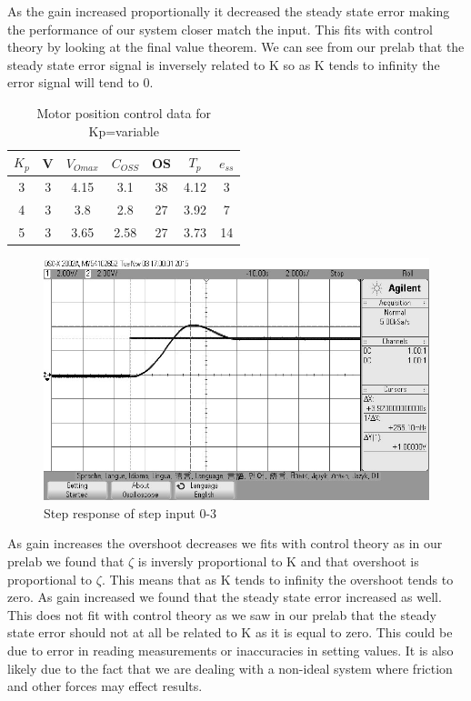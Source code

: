 \documentclass{article}
\begin{document}
As the gain increased proportionally it decreased the steady state error making the performance of our system closer match the input. This fits with control theory by looking at the final value theorem. We can see from our prelab that the steady state error signal is inversely related to K so as K tends to infinity the error signal will tend to 0.

\begin{table}[!htbp]
\centering
    \begin{tabular}{|c|c|c|c|c|c|c|}
        \hline
        $K_p$ & V & $V_{Omax}$ & $C_{OSS}$ & OS & $T_p$ & $e_{ss}$\\
        \hline
        3   & 3     & 4.15     & 3.1   & 38 & 4.12 & 3\\
        \hline
        4   & 3     & 3.8      & 2.8    & 27 & 3.92 & 7\\
        \hline
        5   & 3     & 3.65     & 2.58   & 27 & 3.73 & 14\\
        \hline
    \end{tabular}
    \caption{Motor position control data for Kp=variable}
\end{table}
\begin{figure}[!htbp]
\centering
\includegraphics[width=7in]{step_response_kp1_second_5_2.jpg}
\caption{Step response of step input 0-3}
\end{figure}

As gain increases the overshoot decreases we fits with control theory as in our prelab we found that $\zeta$ is inversly proportional to K and that overshoot is proportional to $\zeta$. This means that as K tends to infinity the overshoot tends to zero. As gain increased we found that the steady state error increased as well. This does not fit with control theory as we saw in our prelab that the steady state error should not at all be related to K as it is equal to zero. This could be due to error in reading measurements or inaccuracies in setting values. It is also likely due to the fact that we are dealing with a non-ideal system where friction and other forces may effect results.

\end{document}
